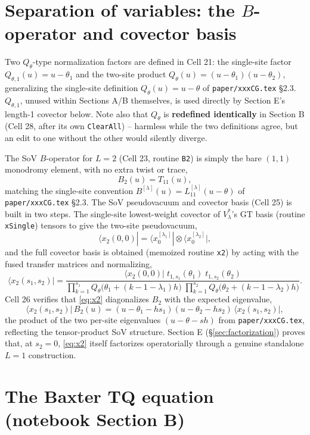 \documentclass[11pt]{article}
\newcommand{\qth}{Q_\theta}
\newcommand{\qthone}{Q_{\theta,1}}
\begin{document}
\section{Separation of variables: the \texorpdfstring{$B$}{B}-operator and covector basis}
\label{sec:sov}

Two $\qth$-type normalization factors are defined in Cell 21: the single-site factor
$\qthone(u)=u-\theta_1$ and the two-site product $\qth(u)=(u-\theta_1)(u-\theta_2)$, generalizing
the single-site definition $\qth(u)=u-\theta$ of \texttt{paper/xxxCG.tex} \S2.3. $\qthone$, unused
within Sections A/B themselves, is used directly by Section E's length-1 covector below. Note also
that $\qth$ is \textbf{redefined identically} in Section B (Cell 28, after its own \texttt{ClearAll})
-- harmless while the two definitions agree, but an edit to one without the other would silently
diverge.

The SoV $B$-operator for $L=2$ (Cell 23, routine \texttt{B2}) is simply the bare $(1,1)$ monodromy
element, with no extra twist or trace,
\[
  B_2(u) = T_{11}(u),
\]
matching the single-site convention $B^{[\lambda]}(u)=L^{[\lambda]}_{11}(u-\theta)$ of
\texttt{paper/xxxCG.tex} \S2.3. The SoV pseudovacuum and covector basis (Cell 25) is built in two
steps. The single-site lowest-weight covector of $V_\lambda^*$'s GT basis (routine \texttt{xSingle})
tensors to give the two-site pseudovacuum,
\[
  \langle x_2(0,0)| = \langle x^{[\lambda_1]}_0|\otimes\langle x^{[\lambda_2]}_0|,
\]
and the full covector basis is obtained (memoized routine \texttt{x2}) by acting with the fused
transfer matrices and normalizing,
\begin{equation}
  \langle x_2(s_1,s_2)| =
  \frac{\langle x_2(0,0)|\;t_{1,s_1}(\theta_1)\;t_{1,s_2}(\theta_2)}
       {\displaystyle\prod_{k=1}^{s_1}\qth\bigl(\theta_1+(k-1-\lambda_1)h\bigr)\;
        \prod_{k=1}^{s_2}\qth\bigl(\theta_2+(k-1-\lambda_2)h\bigr)}.
  \label{eq:x2}
\end{equation}
Cell 26 verifies that \eqref{eq:x2} diagonalizes $B_2$ with the expected eigenvalue,
\[
  \langle x_2(s_1,s_2)|\, B_2(u) = (u-\theta_1-hs_1)(u-\theta_2-hs_2)\,\langle x_2(s_1,s_2)|,
\]
the product of the two per-site eigenvalues $(u-\theta-sh)$ from \texttt{paper/xxxCG.tex}, reflecting
the tensor-product SoV structure. Section E (\S\ref{sec:factorization}) proves that, at $s_2=0$,
\eqref{eq:x2} itself factorizes operatorially through a genuine standalone $L=1$ construction.

\section{The Baxter TQ equation (notebook Section B)}
\label{sec:baxter}
\end{document}
